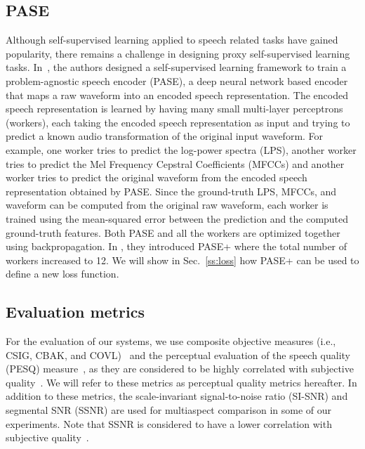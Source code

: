 \documentclass[a4paper]{article}
\begin{document}
\begin{spacing}{0.9}
\subsection{PASE}
\label{ss:pase}
Although self-supervised learning applied to speech related tasks have gained popularity, there remains a challenge in designing proxy self-supervised learning tasks.  In~\cite{Pascual2019,ravanelli2020multi}, the authors designed a self-supervised learning framework to train a problem-agnostic speech encoder (PASE), a deep neural network based encoder that maps a raw waveform into an encoded speech representation.  The encoded speech representation is learned by having many small multi-layer perceptrons (workers), each taking the encoded speech representation as input and trying to predict a known audio transformation of the original input waveform.  For example, one worker tries to predict the log-power spectra (LPS), another worker tries to predict the Mel Frequency Cepstral Coefficients (MFCCs) and another worker tries to predict the original waveform from the encoded speech representation obtained by PASE.  Since the ground-truth LPS, MFCCs, and waveform can be computed from the original raw waveform, each worker is trained using the mean-squared error between the prediction and the computed ground-truth features.  Both PASE and all the workers are optimized together using backpropagation.  
In \cite{ravanelli2020multi}, they introduced PASE+ where the total number of workers increased to 12. 
We will show in Sec.~\ref{ss:loss} how PASE+ can be used to define a new loss function.

\subsection{Evaluation metrics}
For the evaluation of our systems, we use composite objective measures (i.e., CSIG, CBAK, and COVL)~\cite{hu2007evaluation} and 
the perceptual evaluation of the speech quality (PESQ) measure~\cite{rix2001perceptual}, as they are considered to be highly correlated with subjective quality~\cite{hu2007evaluation}.
We will refer to these metrics as perceptual quality metrics hereafter.
In addition to these metrics, the scale-invariant signal-to-noise ratio (SI-SNR) and segmental SNR (SSNR) are used for multiaspect comparison in some of our experiments.
Note that SSNR is considered to have a lower correlation with subjective quality~\cite{hu2007evaluation}.

\end{spacing}
\end{document}
